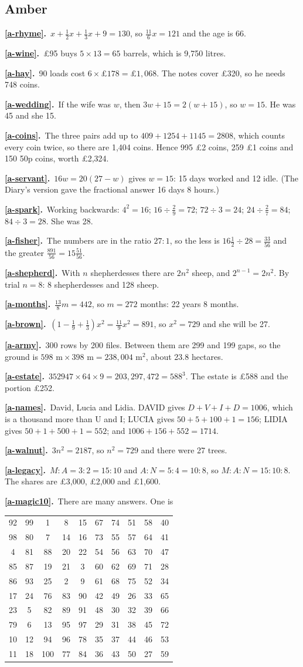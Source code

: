 \documentclass[11pt,a4paper]{article}
\newcommand{\ans}[2]{\par\smallskip\noindent\textbf{\ref{#1}.}\ #2}
\begin{document}
\subsection*{\color{bandamber}Amber}
\ans{a-rhyme}{$x+\tfrac12x+\tfrac13x+9 = 130$, so $\tfrac{11}{6}x = 121$ and the age
is 66.}
\ans{a-wine}{£95 buys $5\times13 = 65$ barrels, which is 9,750 litres.}
\ans{a-hay}{90 loads cost $6\times£178 = £1{,}068$. The notes cover £320, so he needs 748
coins.}
\ans{a-wedding}{If the wife was $w$, then $3w+15 = 2(w+15)$, so $w = 15$. He was 45 and
she 15.}
\ans{a-coins}{The three pairs add up to $409 + 1254 + 1145 = 2808$, which counts every
coin twice, so there are 1,404 coins. Hence 995 £2 coins, 259 £1 coins and 150 50p
coins, worth £2,324.}
\ans{a-servant}{$16w = 20(27-w)$ gives $w = 15$: 15 days worked and 12 idle. (The
Diary's version gave the fractional answer 16 days 8 hours.)}
\ans{a-spark}{Working backwards: $4^2 = 16$; $16\div\tfrac29 = 72$; $72\div3 = 24$;
$24\div\tfrac27 = 84$; $84\div3 = 28$. She was 28.}
\ans{a-fisher}{The numbers are in the ratio $27:1$, so the less is
$16\tfrac12\div28 = \tfrac{33}{56}$ and the greater $\tfrac{891}{56} = 15\tfrac{51}{56}$.}
\ans{a-shepherd}{With $n$ shepherdesses there are $2n^2$ sheep, and $2^{n-1} = 2n^2$. By
trial $n = 8$: 8 shepherdesses and 128 sheep.}
\ans{a-months}{$\tfrac{13}{8}m = 442$, so $m = 272$ months: 22 years 8 months.}
\ans{a-brown}{$\left(1-\tfrac19+\tfrac13\right)x^2 = \tfrac{11}{9}x^2 = 891$, so
$x^2 = 729$ and she will be 27.}
\ans{a-army}{300 rows by 200 files. Between them are 299 and 199 gaps, so the ground is
$598\text{ m}\times398\text{ m} = 238{,}004\text{ m}^2$, about 23.8 hectares.}
\ans{a-estate}{$352947\times64\times9 = 203{,}297{,}472 = 588^3$. The estate is £588 and
the portion £252.}
\ans{a-names}{David, Lucia and Lidia. DAVID gives $D+V+I+D = 1006$, which is a thousand
more than U and I; LUCIA gives $50+5+100+1 = 156$; LIDIA gives $50+1+500+1 = 552$; and
$1006+156+552 = 1714$.}
\ans{a-walnut}{$3n^2 = 2187$, so $n^2 = 729$ and there were 27 trees.}
\ans{a-legacy}{$M:A = 3:2 = 15:10$ and $A:N = 5:4 = 10:8$, so $M:A:N = 15:10:8$. The
shares are £3,000, £2,000 and £1,600.}
\ans{a-magic10}{There are many answers. One is
\begin{center}\small\setlength{\tabcolsep}{4pt}\begin{tabular}{cccccccccc}
92 & 99 & 1 & 8 & 15 & 67 & 74 & 51 & 58 & 40\\
98 & 80 & 7 & 14 & 16 & 73 & 55 & 57 & 64 & 41\\
4 & 81 & 88 & 20 & 22 & 54 & 56 & 63 & 70 & 47\\
85 & 87 & 19 & 21 & 3 & 60 & 62 & 69 & 71 & 28\\
86 & 93 & 25 & 2 & 9 & 61 & 68 & 75 & 52 & 34\\
17 & 24 & 76 & 83 & 90 & 42 & 49 & 26 & 33 & 65\\
23 & 5 & 82 & 89 & 91 & 48 & 30 & 32 & 39 & 66\\
79 & 6 & 13 & 95 & 97 & 29 & 31 & 38 & 45 & 72\\
10 & 12 & 94 & 96 & 78 & 35 & 37 & 44 & 46 & 53\\
11 & 18 & 100 & 77 & 84 & 36 & 43 & 50 & 27 & 59\\
\end{tabular}\end{center}}
\end{document}
